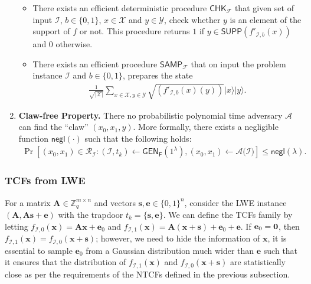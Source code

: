 \begin{defn}
\begin{enumerate}
\begin{itemize}
        \item There exists an efficient deterministic procedure $\mathsf{CHK}_{\mathcal{F}}$ that given set of input $\mathcal{I}$, $b\in\{0,1\}$, $x\in \mathcal{X}$ and $y\in \mathcal{Y}$, check whether $y$ is an element of the support of $f$ or not. This procedure returns $1$ if $y\in \mathsf{SUPP}(f'_{\mathcal{I},b}(x))$ and $0$ otherwise. 
        \item 
        There exists an efficient procedure $\mathsf{SAMP}_{\mathcal{F}}$ that on input the problem instance $\mathcal{I}$ and $b\in\{0,1\}$, prepares the state
        \begin{align}
            \displaystyle{\frac{1}{\sqrt{|\mathcal{X}|}}}\sum_{x\in\mathcal{X},y\in\mathcal{Y}}\sqrt{(f'_{\mathcal{I},b}(x)(y))}|x\rangle|y\rangle.
        \end{align}
    \end{itemize}
    \item \textbf{Claw-free Property.} There no probabilistic polynomial time adversary $\mathcal{A}$ can find the ``claw'' $(x_0,x_1,y)$. More formally, there exists a negligible function $\mathsf{negl}(\cdot)$ such that the following holds:
    \begin{align}
        \Pr[(x_0,x_1)\in\mathcal{R}_{\mathcal{I}}:(\mathcal{I},t_k)\gets \mathsf{GEN}_{\mathsf{F}}(1^{\lambda}),(x_0,x_1)\gets \mathcal{A}(\mathcal{I)}]\leq \mathsf{negl}(\lambda).
    \end{align}
\end{enumerate}
\end{defn}

\subsubsection{TCFs from LWE}
For a matrix $\mathbf{A}\in\mathbb{Z}^{m\times n}_q$ and vectors $\mathbf{s},\mathbf{e}\in\{0,1\}^n$, consider the LWE instance $(\mathbf{A},\mathbf{A}\mathbf{s}+\mathbf{e})$ with the trapdoor $t_k=\{\mathbf{s},\mathbf{e}\}$. We can define the TCFs family by letting $f_{\mathcal{I},0}(\mathbf{x})=\mathbf{A}\mathbf{x}+\mathbf{e}_0$ and $f_{\mathcal{I},1}(\mathbf{x})=\mathbf{A}(\mathbf{x}+\mathbf{s})+\mathbf{e}_0+\mathbf{e}$. If $\mathbf{e}_0 =\bf{0}$, then $f_{\mathcal{I},1}(\mathbf{x})=f_{\mathcal{I},0}(\mathbf{x}+\mathbf{s})$; however, we need to hide the information of $\mathbf{x}$, it is essential to sample $\mathbf{e}_0$ from a Gaussian distribution much wider than $\mathbf{e}$ such that it ensures that the distribution of $f_{\mathcal{I},1}(\mathbf{x})$ and $f_{\mathcal{I},0}(\mathbf{x}+\mathbf{s})$ are statistically close as per the requirements of the NTCFs defined in the previous subsection.

